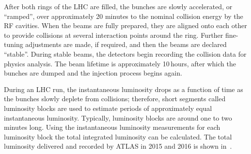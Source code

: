After both rings of the LHC are filled, the bunches are slowly accelerated, or ``ramped'', over approximately 20 minutes to the nominal collision energy by the RF cavities. When the beams are fully prepared, they are aligned onto each other to provide collisions
at several interaction points around the ring. Further fine-tuning adjustments are made, if required, and then the beams are declared ``stable''. During stable beams, the detectors begin recording the collision data for physics analysis. The beam lifetime is approximately 10\,hours, after which the bunches are dumped and the injection process begins again. 

During an LHC run, the instantaneous luminosity drops as a function of time as the bunches slowly deplete from collisions; therefore, short segments called luminosity blocks are used to estimate periods of approximately equal instantaneous luminosity. Typically, luminosity blocks are around one to two minutes long. Using the instantaneous luminosity measurements for each luminosity block the total integrated luminosity can be calculated. The total luminosity delivered and recorded by ATLAS in 2015 and 2016 is shown in~\Fig{\ref{fig:lumi_2015_2016}}.

